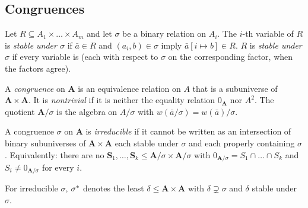 \subsection{Congruences}

\begin{definition}[Stability]\label{def:stable}
Let $R\subseteq A_{1}\times\dots\times A_{m}$ and let $\sigma$ be a binary
relation on $A_{i}$. The $i$-th variable of $R$ is \emph{stable under $\sigma$}
if $\bar a\in R$ and $(a_{i},b)\in\sigma$ imply $\bar a[i\mapsto b]\in R$.
$R$ is \emph{stable under $\sigma$} if every variable is (each with respect to
$\sigma$ on the corresponding factor, when the factors agree).
\end{definition}

\begin{definition}[Congruence]\label{def:congruence}
A \emph{congruence} on $\mathbf A$ is an equivalence relation on $A$ that is a
subuniverse of $\mathbf A\times\mathbf A$. It is \emph{nontrivial} if it is
neither the equality relation $0_{\mathbf A}$ nor $A^{2}$. The quotient
$\mathbf A/\sigma$ is the algebra on $A/\sigma$ with
$w(\bar a/\sigma)=w(\bar a)/\sigma$.
\end{definition}

\begin{definition}\label{def:irreducible}
A congruence $\sigma$ on $\mathbf A$ is \emph{irreducible} if it cannot be
written as an intersection of binary subuniverses of $\mathbf A\times\mathbf A$
each stable under $\sigma$ and each properly containing $\sigma$. Equivalently:
there are no $\mathbf S_{1},\dots,\mathbf S_{k}\le\mathbf A/\sigma\times
\mathbf A/\sigma$ with $0_{\mathbf A/\sigma}=S_{1}\cap\dots\cap S_{k}$ and
$S_{i}\neq 0_{\mathbf A/\sigma}$ for every $i$.

For irreducible $\sigma$, $\sigma^{*}$ denotes the least
$\delta\le\mathbf A\times\mathbf A$ with $\delta\supsetneq\sigma$ and $\delta$
stable under $\sigma$.
\end{definition}

